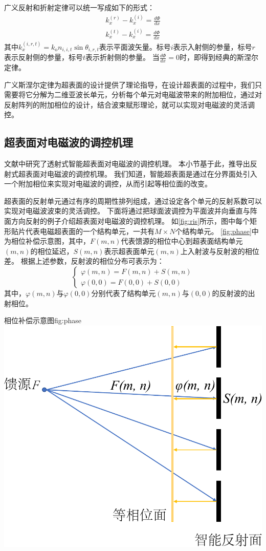 \documentclass[supercite]{HustGraduPaper}
\begin{document}
广义反射和折射定律可以统一写成如下的形式\cite{ding2017gradient}：
\begin{eqnarray}
	k_{x}^{(r)}-k_{x}^{(i)}=\frac{d \Phi}{d x} \\
	k_{x}^{(t)}-k_{x}^{(i)}=\frac{d \Phi}{d x}
\end{eqnarray}
其中$k_{x}^{(i, r, t)}=k_{\mathrm{o}} n_{i, i, t} \sin \theta_{i, r, t}$表示平面波矢量。标号$i$表示入射侧的参量，标号$r$表示反射侧的参量，标号$t$表示折射侧的参量。
当$\frac{d \Phi}{d x}=0$时，即得到经典的斯涅尔定律。

广义斯涅尔定律为超表面的设计提供了理论指导，在设计超表面的过程中，我们只需要将它分解为二维亚波长单元，分析每个单元对电磁波带来的附加相位，通过对反射阵列的附加相位的设计，结合波束赋形理论，就可以实现对电磁波的灵活调控。

\subsection{超表面对电磁波的调控机理}

文献中研究了透射式智能超表面对电磁波的调控机理。
本小节基于此，推导出反射式超表面对电磁波的调控机理。
我们知道，智能超表面是通过在分界面处引入一个附加相位来实现对电磁波的调控，从而引起等相位面的改变。

超表面的反射单元通过有序的周期性排列组成，通过设定各个单元的反射系数可以实现对电磁波波束的灵活调控。
下面将通过把球面波调控为平面波并向垂直与阵面方向反射的例子介绍超表面对电磁波的调控机理。
如\autoref{fig:ris}所示，图中每个矩形贴片代表电磁超表面的一个结构单元，一共有$M \times N$个结构单元。
\autoref{fig:phase}中为相位补偿示意图，其中，$F(m,n)$代表馈源的相位中心到超表面结构单元$(m,n)$的相位延迟，$S(m,n)$表示超表面单元$(m,n)$上入射波与反射波的相位差。
根据上述参数，反射波的相位分布可表示为：
\begin{equation}
	\left\{
		\begin{array}{l}
			\varphi(m,n)=F(m,n)+S(m,n) \\
			\varphi(0,0)=F(0,0)+S(0,0)
		\end{array}
	\right.
\end{equation}
其中，$\varphi(m,n)$与$\varphi(0,0)$分别代表了结构单元$(m,n)$与$(0,0)$的反射波的出射相位。
 
\begin{generalfig}[htb]{相位补偿示意图}{fig:phase}
	\includegraphics[width=0.5\linewidth]{Figures/phase.pdf}
\end{generalfig}
\end{document}
